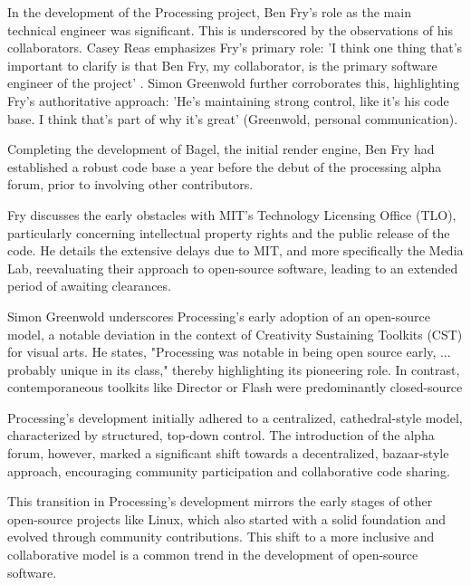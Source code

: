 



In the development of the Processing project, Ben Fry's role as the main technical engineer was significant. This is underscored by the observations of his collaborators. Casey Reas emphasizes Fry's primary role: 'I think one thing that’s important to clarify is that Ben Fry, my collaborator, is the primary software engineer of the project' \parencite[p. 330]{conradGraphicDesignPostdigital2021}. Simon Greenwold further corroborates this, highlighting Fry's authoritative approach: 'He's maintaining strong control, like it's his code base. I think that's part of why it's great' (Greenwold, personal communication).

Completing the development of Bagel, the initial render engine, Ben Fry had established a robust code base a year before the debut of the processing alpha forum, prior to involving other contributors.

Fry discusses the early obstacles with MIT's Technology Licensing Office (TLO), particularly concerning intellectual property rights and the public release of the code. He details the extensive delays due to MIT, and more specifically the Media Lab, reevaluating their approach to open-source software, leading to an extended period of awaiting clearances.

Simon Greenwold underscores Processing's early adoption of an open-source model, a notable deviation in the context of Creativity Sustaining Toolkits (CST) for visual arts. He states, "Processing was notable in being open source early, ... probably unique in its class," thereby highlighting its pioneering role. In contrast, contemporaneous toolkits like Director or Flash were predominantly closed-source

Processing's development initially adhered to a centralized, cathedral-style model, characterized by structured, top-down control. The introduction of the alpha forum, however, marked a significant shift towards a decentralized, bazaar-style approach, encouraging community participation and collaborative code sharing.

This transition in Processing's development mirrors the early stages of other open-source projects like Linux, which also started with a solid foundation and evolved through community contributions. This shift to a more inclusive and collaborative model is a common trend in the development of open-source software.

